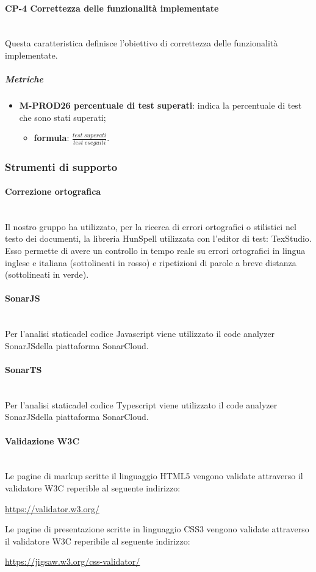 	\paragraph{CP-4 Correttezza delle funzionalità implementate} \mbox{}\\ [1mm]
	Questa caratteristica definisce l'obiettivo di correttezza delle funzionalità implementate.
	\subparagraph{Metriche}
	\begin{itemize}
		\item \textbf{M-PROD26 percentuale di test superati}: indica la percentuale di test che sono stati superati;
		\begin{itemize}
			\item[] \textbf{formula}: $\frac{test \; superati}{test \; eseguiti}$.
		\end{itemize}
	\end{itemize}

\subsubsection{Strumenti di supporto}
	\paragraph{Correzione ortografica}\mbox{}\\ [1mm]
	Il nostro gruppo ha utilizzato, per la ricerca di errori ortografici o stilistici nel testo dei documenti, la libreria HunSpell utilizzata con l'editor di test: TexStudio. Esso permette di avere un controllo in tempo reale su errori ortografici in lingua inglese e italiana (sottolineati in rosso) e ripetizioni di parole a breve distanza (sottolineati in verde).
	\paragraph{SonarJS}\mbox{}\\ [1mm]
	Per l'analisi statica\glosp del codice Javascript viene utilizzato il code analyzer SonarJS\glosp della piattaforma SonarCloud.
	\paragraph{SonarTS}\mbox{}\\ [1mm]
	Per l'analisi statica\glosp del codice Typescript viene utilizzato il code analyzer SonarJS\glosp della piattaforma SonarCloud.
	\paragraph{Validazione W3C}\mbox{}\\ [1mm]
	Le pagine di markup scritte il linguaggio HTML5 vengono validate attraverso il validatore W3C reperible al seguente indirizzo: 
	\begin{center}
		\url{https://validator.w3.org/}
	\end{center}
	Le pagine di presentazione scritte in linguaggio CSS3 vengono validate attraverso il validatore W3C reperibile al seguente indirizzo:
	\begin{center}
		\url{https://jigsaw.w3.org/css-validator/}
	\end{center}

